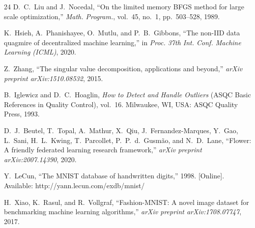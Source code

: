 \documentclass[journal]{IEEEtran}
\begin{document}
\begin{thebibliography}{24}
D.~C.~Liu and J.~Nocedal, ``On the limited memory BFGS method for large scale optimization,'' \textit{Math. Program.}, vol.~45, no.~1, pp.~503--528, 1989.

K.~Hsieh, A.~Phanishayee, O.~Mutlu, and P.~B.~Gibbons, ``The non-IID data quagmire of decentralized machine learning,'' in \textit{Proc. 37th Int. Conf. Machine Learning (ICML)}, 2020.

Z.~Zhang, ``The singular value decomposition, applications and beyond,'' \textit{arXiv preprint arXiv:1510.08532}, 2015.

B.~Iglewicz and D.~C.~Hoaglin, \textit{How to Detect and Handle Outliers} (ASQC Basic References in Quality Control), vol.~16.\hskip 1sp Milwaukee, WI, USA: ASQC Quality Press, 1993.

D.~J.~Beutel, T.~Topal, A.~Mathur, X.~Qiu, J.~Fernandez-Marques, Y.~Gao, L.~Sani, H.~L.~Kwing, T.~Parcollet, P.~P.~d.~Gusm\~{a}o, and N.~D.~Lane, ``Flower: A friendly federated learning research framework,'' \textit{arXiv preprint arXiv:2007.14390}, 2020.

Y.~LeCun, ``The MNIST database of handwritten digits,'' 1998. [Online]. Available: http://yann.lecun.com/exdb/mnist/

H.~Xiao, K.~Rasul, and R.~Vollgraf, ``Fashion-MNIST: A novel image dataset for benchmarking machine learning algorithms,'' \textit{arXiv preprint arXiv:1708.07747}, 2017.

\end{thebibliography}
\end{document}
